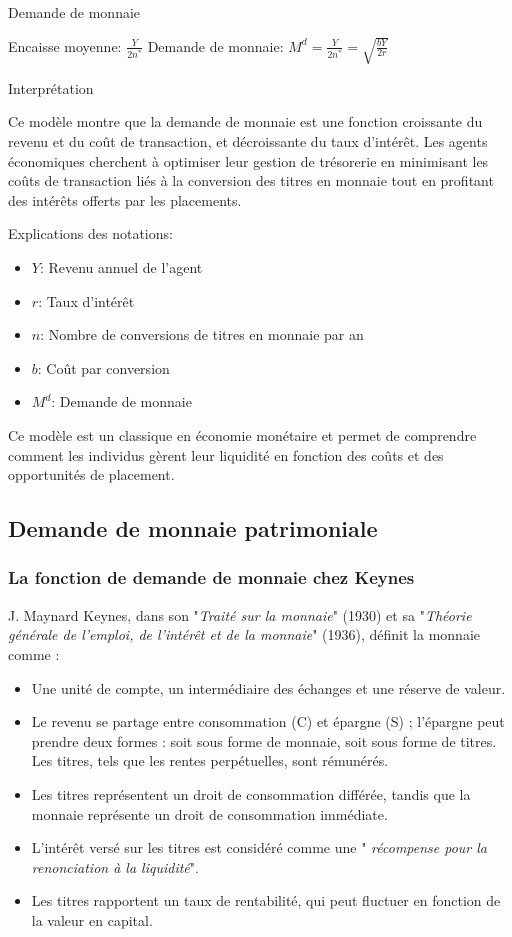\documentclass[a4paper, 12pt]{report}
\begin{document}
 Demande de monnaie

Encaisse moyenne: $\frac{Y}{2n^*}$
Demande de monnaie: $M^d = \frac{Y}{2n^*} = \sqrt{\frac{bY}{2r}}$

Interprétation

Ce modèle montre que la demande de monnaie est une fonction croissante du revenu et du coût de transaction, et décroissante du taux d'intérêt. Les agents économiques cherchent à optimiser leur gestion de trésorerie en minimisant les coûts de transaction liés à la conversion des titres en monnaie tout en profitant des intérêts offerts par les placements.

Explications des notations:
\begin{itemize}
	\item $Y$: Revenu annuel de l'agent
	\item $r$: Taux d'intérêt
	\item $n$: Nombre de conversions de titres en monnaie par an
	\item $b$: Coût par conversion
	\item $M^d$: Demande de monnaie
\end{itemize}

Ce modèle est un classique en économie monétaire et permet de comprendre comment les individus gèrent leur liquidité en fonction des coûts et des opportunités de placement.

	
\subsection{Demande de monnaie patrimoniale}

\subsubsection{La fonction de demande de monnaie chez Keynes}

J. Maynard Keynes, dans son "\textit{Traité sur la monnaie}" (1930) et sa "\textit{Théorie générale de l'emploi, de l'intérêt et de la monnaie}" (1936), définit la monnaie comme :
\begin{itemize}
	\item Une unité de compte, un intermédiaire des échanges et une réserve de valeur.
	\item Le revenu se partage entre consommation (C) et épargne (S) ; l'épargne peut prendre deux formes : soit sous forme de monnaie, soit sous forme de titres. Les titres, tels que les rentes perpétuelles, sont rémunérés.
	\item Les titres représentent un droit de consommation différée, tandis que la monnaie représente un droit de consommation immédiate.
	\item L'intérêt versé sur les titres est considéré comme une " \textit{récompense pour la renonciation à la liquidité}".
	\item Les titres rapportent un taux de rentabilité, qui peut fluctuer en fonction de la valeur en capital.
\end{itemize}
\end{document}
